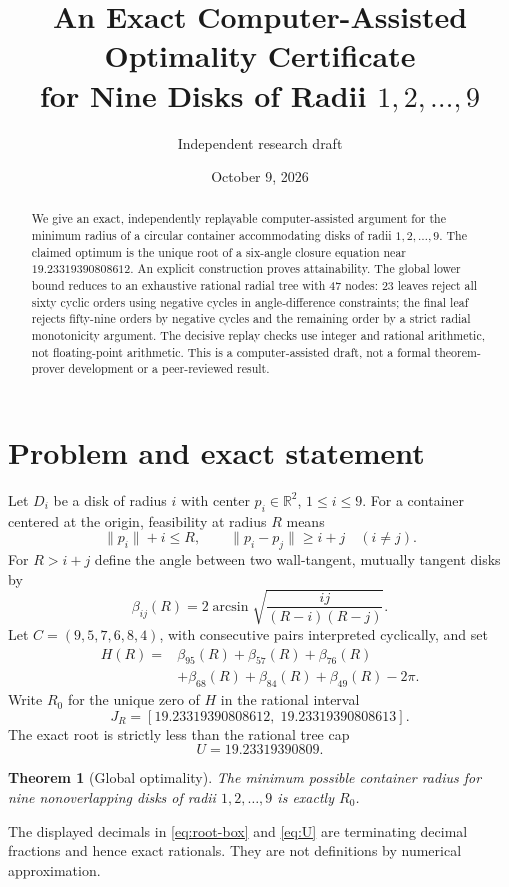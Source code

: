\documentclass[11pt,a4paper]{article}
\title{An Exact Computer-Assisted Optimality Certificate\\for Nine Disks of Radii $1,2,\ldots,9$}
\author{Independent research draft}
\date{October 9, 2026}
\newtheorem{theorem}{Theorem}[section]
\newcommand{\Rzero}{R_0}
\begin{document}
\maketitle
\begin{abstract}
We give an exact, independently replayable computer-assisted argument for the minimum radius of a circular container accommodating disks of radii $1,2,\ldots,9$.  The claimed optimum is the unique root of a six-angle closure equation near $19.23319390808612$. An explicit construction proves attainability. The global lower bound reduces to an exhaustive rational radial tree with 47 nodes: 23 leaves reject all sixty cyclic orders using negative cycles in angle-difference constraints; the final leaf rejects fifty-nine orders by negative cycles and the remaining order by a strict radial monotonicity argument. The decisive replay checks use integer and rational arithmetic, not floating-point arithmetic. This is a computer-assisted draft, not a formal theorem-prover development or a peer-reviewed result.
\end{abstract}

\section{Problem and exact statement}
Let $D_i$ be a disk of radius $i$ with center $p_i\in\mathbb R^2$, $1\le i\le9$. For a container centered at the origin, feasibility at radius $R$ means
\begin{equation}\label{eq:feasibility}
\|p_i\|+i\le R,\qquad\|p_i-p_j\|\ge i+j\quad (i\ne j).
\end{equation}
For $R>i+j$ define the angle between two wall-tangent, mutually tangent disks by
\begin{equation}\label{eq:beta}
\beta_{ij}(R)=2\arcsin\sqrt{\frac{ij}{(R-i)(R-j)}}.
\end{equation}
Let $C=(9,5,7,6,8,4)$, with consecutive pairs interpreted cyclically, and set
\begin{equation}\label{eq:closure}
\begin{aligned}
H(R)={}&\beta_{95}(R)+\beta_{57}(R)+\beta_{76}(R)\\
&+\beta_{68}(R)+\beta_{84}(R)+\beta_{49}(R)-2\pi.
\end{aligned}
\end{equation}
Write $\Rzero$ for the unique zero of $H$ in the rational interval
\begin{equation}\label{eq:root-box}
J_R=[19.23319390808612,\;19.23319390808613].
\end{equation}
The exact root is strictly less than the rational tree cap
\begin{equation}\label{eq:U}
 U=19.23319390809.
\end{equation}
\begin{theorem}[Global optimality]\label{thm:main}
The minimum possible container radius for nine nonoverlapping disks of radii $1,2,\ldots,9$ is exactly $\Rzero$.
\end{theorem}
The displayed decimals in \eqref{eq:root-box} and \eqref{eq:U} are terminating decimal fractions and hence exact rationals. They are not definitions by numerical approximation.
\end{document}
